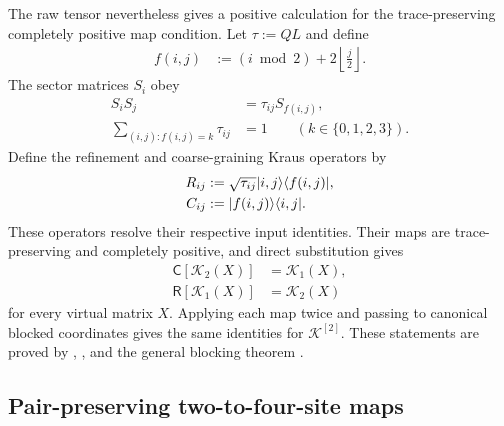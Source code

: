 \documentclass{article}
\begin{document}
The raw tensor nevertheless gives a positive calculation for the
trace-preserving completely positive map condition. Let $\tau:=QL$ and define
\begin{align}
    f(i,j)
        &:= (i\bmod 2)+2\left\lfloor\frac j2\right\rfloor.
    \label{eq:cpgsv17_label_coarsening_function}
\end{align}
The sector matrices $S_i$ obey
\begin{align}
    S_iS_j
        &= \tau_{ij}S_{f(i,j)},
    \label{eq:cpgsv17_sector_matrix_multiplication}\\
    \sum_{(i,j):f(i,j)=k}\tau_{ij}
        &= 1
        \qquad (k\in\{0,1,2,3\}).
    \label{eq:cpgsv17_coarsening_weight_normalization}
\end{align}
Define the refinement and coarse-graining Kraus operators by
\begin{align}
    R_{ij}
        &:= \sqrt{\tau_{ij}}|i,j\rangle\langle f(i,j)|,
    \label{eq:cpgsv17_refinement_kraus_operator}\\
    C_{ij}
        &:= |f(i,j)\rangle\langle i,j|.
    \label{eq:cpgsv17_coarse_graining_kraus_operator}
\end{align}
These operators resolve their respective input identities. Their maps are
trace-preserving and completely positive, and direct substitution gives
\begin{align}
    \mathsf C[\mathcal K_2(X)]
        &= \mathcal K_1(X),
    \label{eq:cpgsv17_coarse_graining_closure}\\
    \mathsf R[\mathcal K_1(X)]
        &= \mathcal K_2(X)
    \label{eq:cpgsv17_refinement_closure}
\end{align}
for every virtual matrix $X$. Applying each map twice and passing to canonical
blocked coordinates gives the same identities for $\mathcal K^{[2]}$. These
statements are proved by
,
, and the general blocking theorem
.

\subsection{Pair-preserving two-to-four-site maps}
\label{sec:cpgsv17_pair_preserving_maps}
\end{document}
